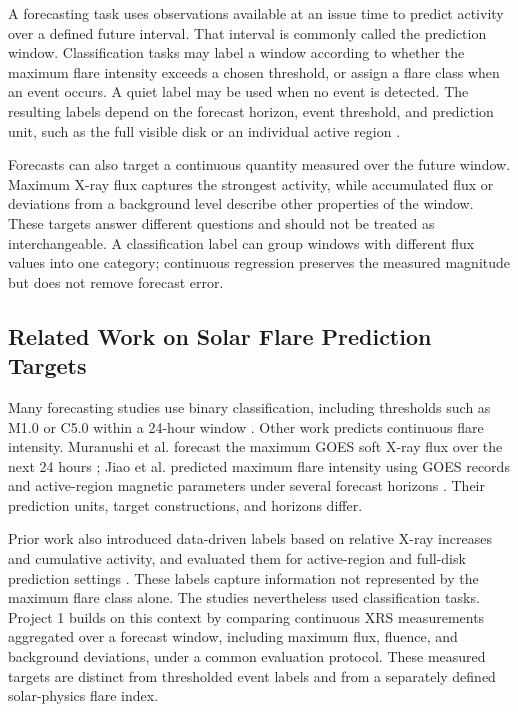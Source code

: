 \documentclass[12pt]{report}
\begin{document}
A forecasting task uses observations available at an issue time to predict activity over a defined future interval. That interval is commonly called the prediction window. Classification tasks may label a window according to whether the maximum flare intensity exceeds a chosen threshold, or assign a flare class when an event occurs. A quiet label may be used when no event is detected. The resulting labels depend on the forecast horizon, event threshold, and prediction unit, such as the full visible disk or an individual active region \citep{barnes2016comparison,cinto2020framework}.

Forecasts can also target a continuous quantity measured over the future window. Maximum X-ray flux captures the strongest activity, while accumulated flux or deviations from a background level describe other properties of the window. These targets answer different questions and should not be treated as interchangeable. A classification label can group windows with different flux values into one category; continuous regression preserves the measured magnitude but does not remove forecast error.

\subsection{Related Work on Solar Flare Prediction Targets}

Many forecasting studies use binary classification, including thresholds such as M1.0 or C5.0 within a 24-hour window \citep{barnes2016comparison,cinto2020framework,pandey2025ordinal,pandey2024embedding,ji2024towards,hong2023enhancing,hong2023innovative}. Other work predicts continuous flare intensity. Muranushi et al. forecast the maximum GOES soft X-ray flux over the next 24 hours \citep{muranushi2015ufcorin}; Jiao et al. predicted maximum flare intensity using GOES records and active-region magnetic parameters under several forecast horizons \citep{jiao2020solar}. Their prediction units, target constructions, and horizons differ.

Prior work also introduced data-driven labels based on relative X-ray increases and cumulative activity, and evaluated them for active-region and full-disk prediction settings \citep{hong2023innovative,hong2023beyond,hong2023enhancing}. These labels capture information not represented by the maximum flare class alone. The studies nevertheless used classification tasks. Project 1 builds on this context by comparing continuous XRS measurements aggregated over a forecast window, including maximum flux, fluence, and background deviations, under a common evaluation protocol. These measured targets are distinct from thresholded event labels and from a separately defined solar-physics flare index.
\end{document}
